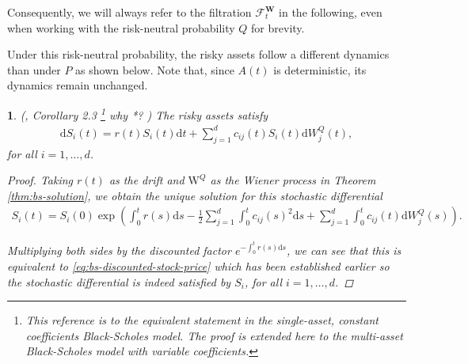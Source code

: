 \documentclass[english]{article}
\newcommand{\comment}[1]{\color{blue}#1\color{black}}
\numberwithin{equation}{section}
\numberwithin{figure}{section}
\theoremstyle{bolddescit}
\newtheorem{theorem}{\protect\theoremname}[section]
\theoremstyle{definition}
\theoremstyle{definition}
\theoremstyle{plain}
\theoremstyle{plain}
\theoremstyle{bolddesc}
\theoremstyle{plain}
\theoremstyle{remark}
\providecommand{\theoremname}{Theorem}
\begin{document}
Consequently, we will always refer to the filtration $\mathcal{F}^\mathbf{W}_t$ in the following, even when working with the risk-neutral probability $Q$ for brevity.

Under this risk-neutral probability, the risky assets follow a different dynamics than under $P$ as shown below. Note that, since $A(t)$ is deterministic, its dynamics remain unchanged.

\begin{theorem}\label{thm:bs-risk-neutral-dynamics}
  (\cite{capinski_blackscholes_2012}, Corollary 2.3 \footnote{This reference is to the equivalent statement in the single-asset, constant coefficients Black-Scholes model. The proof is extended here to the multi-asset Black-Scholes model with variable coefficients.\label{foot:basic-bs-model}}
\comment{why *?}
  )
  The risky assets satisfy
  \begin{align*}
    \mathrm{d}S_i(t) = r(t) S_i(t) \mathrm{d}t + \sum_{j=1}^{d} c_{ij}(t) S_i(t) \mathrm{d}W^Q_j(t),
  \end{align*}
  for all $i=1,\ldots,d$.

  \begin{proof}
    Taking $r(t)$ as the drift and $\mathrm{W}^Q$ as the Wiener process in Theorem \ref{thm:bs-solution}, we obtain the unique solution for this stochastic differential
    \begin{align}\label{eq:bs-risk-neutral-dynamics}
      S_i(t)
      = S_i(0) \exp  \left( \int_0^t r(s) \mathrm{d}s - \frac{1}{2} \sum_{j=1}^{d} \int_0^t c_{ij}(s)^2 \mathrm{d}s + \sum_{j=1}^d \int_0^t c_{ij}(t) \mathrm{d}W^Q_j(s)\right).
    \end{align}

    Multiplying both sides by the discounted factor $e^{-\int_0^t r(s) \mathrm{d}s}$, we can see that this is equivalent to \eqref{eq:bs-discounted-stock-price} which has been established earlier so the stochastic differential is indeed satisfied by $S_i$, for all $i=1,\ldots,d$.
  \end{proof}
\end{theorem}
\end{document}
